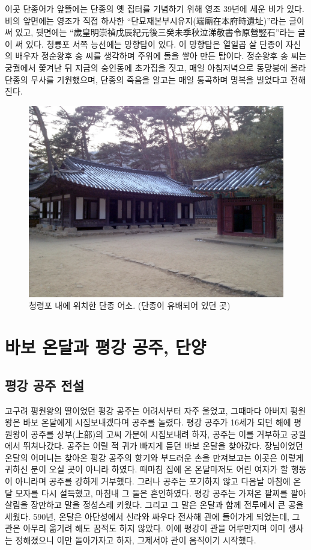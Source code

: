이곳 단종어가 앞뜰에는 단종의 옛 집터를 기념하기 위해 영조 39년에 세운 비가 있다. 
비의 앞면에는 영조가 직접 하사한 ``단묘재본부시유지(端廟在本府時遺址)''라는 글이 써 있고, 
뒷면에는 ``歲皇明崇禎戊辰紀元後三癸未季秋泣涕敬書令原營竪石''라는 글이 써 있다. 
청룡포 서쪽 능선에는 망향탑이 있다. 이 망향탑은 열일곱 살 단종이 자신의 배우자 정순왕후 송 씨를 생각하며 주위에 돌을 쌓아 만든 탑이다. 
정순왕후 송 씨는 궁궐에서 쫓겨난 뒤 지금의 숭인동에 초가집을 짓고, 매일 아침저녁으로 동망봉에 올라 단종의 무사를 기원했으며, 
단종의 죽음을 알고는 매일 통곡하며 명복을 빌었다고 전해진다. 

\begin{figure}[ht]
    \centering
    \includegraphics[width=.6\textwidth]{s_img/청령포_사진_2.JPG}
    \caption{청령포 내에 위치한 단종 어소. (단종이 유배되어 있던 곳) \protect\footnotemark}
    \label{fig:my_label_s31}
\end{figure}


\section{바보 온달과 평강 공주, 단양}
\subsection{평강 공주 전설}
고구려 평원왕의 딸이었던 평강 공주는 어려서부터 자주 울었고, 그때마다 아버지 평원왕은 바보 온달에게 시집보내겠다며 공주를 놀렸다. 
평강 공주가 16세가 되던 해에 평원왕이 공주를 상부(上部)의 고씨 가문에 시집보내려 하자, 
공주는 이를 거부하고 궁궐에서 뛰쳐나갔다. 공주는 어릴 적 귀가 빠지게 듣던 바보 온달을 찾아갔다. 
장님이었던 온달의 어머니는 찾아온 평강 공주의 향기와 부드러운 손을 만져보고는 이곳은 이렇게 귀하신 분이 오실 곳이 아니라 하였다. 
때마침 집에 온 온달마저도 어린 여자가 할 행동이 아니라며 공주를 강하게 거부했다. 
그러나 공주는 포기하지 않고 다음날 아침에 온달 모자를 다시 설득했고, 마침내 그 둘은 혼인하였다. 
평강 공주는 가져온 팔찌를 팔아 살림을 장만하고 말을 정성스레 키웠다. 그리고 그 말은 온달과 함께 전투에서 큰 공을 세웠다. 
590년, 온달은 아단성에서 신라와 싸우다 전사해 관에 들어가게 되었는데, 
그 관은 아무리 옮기려 해도 꿈적도 하지 않았다. 
이에 평강이 관을 어루만지며 이미 생사는 정해졌으니 이만 돌아가자고 하자, 그제서야 관이 움직이기 시작했다. 


